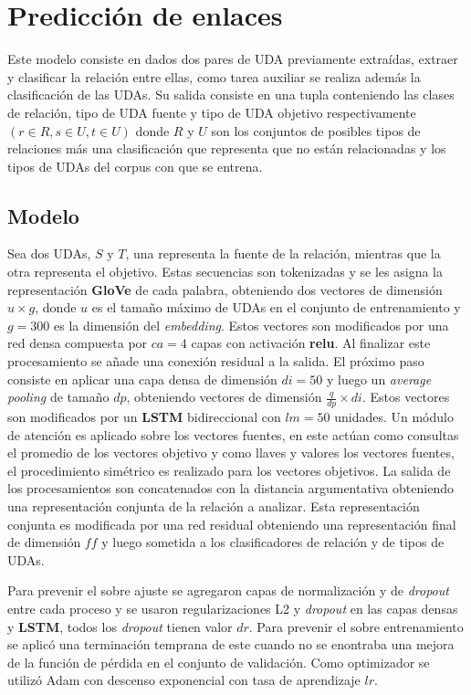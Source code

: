 \section{Predicción de enlaces}

Este modelo consiste en dados dos pares de UDA previamente extraídas, 
extraer y clasificar la relación entre ellas, como tarea auxiliar se realiza además la clasificación 
de las UDAs. Su salida consiste en una tupla conteniendo las clases de relación, tipo de UDA fuente y 
tipo de UDA objetivo respectivamente $(r \in R, s \in U, t \in U)$ donde $R$ y $U$ son los conjuntos de 
posibles tipos de relaciones más una clasificación que representa que no están relacionadas y los tipos de UDAs 
del corpus con que se entrena.

\subsection{Modelo}

Sea dos UDAs, $S$ y $T$, una representa la fuente de la relación, mientras que la otra representa
el objetivo. Estas secuencias son tokenizadas y se les asigna la representación \textbf{GloVe} de cada palabra, obteniendo
dos vectores de dimensión $u \times g$, donde $u$ es el tamaño máximo de UDAs en el conjunto de entrenamiento
y $g=300$ es la dimensión del \emph{embedding}.
Estos vectores son modificados por una red densa compuesta por $ca = 4$ capas con activación \textbf{relu}. 
Al finalizar este procesamiento se añade una conexión residual
a la salida. El próximo paso consiste en aplicar una capa densa de dimensión $di=50$ y luego un \emph{average pooling}
de tamaño $dp$, obteniendo vectores de dimensión $\frac{q}{dp} \times di$. 
Estos vectores son modificados por un \textbf{LSTM} bidireccional con $lm=50$ unidades. Un módulo de atención es aplicado 
sobre los vectores fuentes, 
en este actúan como consultas el promedio de los vectores objetivo y como llaves y valores los vectores fuentes,
el procedimiento simétrico es realizado para los vectores objetivos.
La salida de los procesamientos son concatenados con la distancia argumentativa obteniendo una representación 
conjunta de la relación a analizar. Esta representación conjunta es modificada por una red residual obteniendo
una representación final de dimensión $ff$ y luego sometida a los clasificadores de relación y de tipos de UDAs.

Para prevenir el sobre ajuste se agregaron capas de normalización y de \emph{dropout} entre cada 
proceso y se usaron regularizaciones L2 y \emph{dropout} en las capas densas y \textbf{LSTM}, 
todos los \emph{dropout} tienen valor $dr$. Para prevenir el sobre entrenamiento se aplicó una 
terminación temprana de este cuando no se enontraba una mejora de la función de pérdida en el 
conjunto de validación. Como optimizador se utilizó Adam con descenso exponencial con tasa de 
aprendizaje $lr$.

